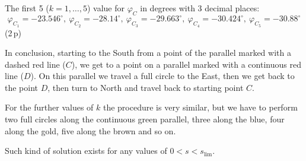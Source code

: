 \begin{description}
  The first 5 ($k = 1, \ldots, 5$) value for $\varphi_C$ in degrees with 3
  decimal places:
  \[
    \varphi_{C_1} = -23.546^\circ,\ \varphi_{C_2} = -28.14^\circ,\
    \varphi_{C_3} = -29.663^\circ,\ \varphi_{C_4} = -30.424^\circ,\
    \varphi_{C_5} = -30.88^\circ
  \]
  \hfill(2\,p)

  In conclusion, starting to the South from a point of the parallel marked with
  a dashed red line ($C$), we get to a point on a parallel marked with a
  continuous red line ($D$). On this parallel we travel a full circle to the
  East, then we get back to the point $D$, then turn to North and travel back
  to starting point $C$.

  For the further values of $k$ the procedure is very similar, but we have to
  perform two full circles along the continuous green parallel, three along the
  blue, four along the gold, five along the brown and so on.

  Such kind of solution exists for any values of $0 < s < s_{\lim}$.

  \ioaafig{2019_TH_10-s4.pdf}
\end{description}

